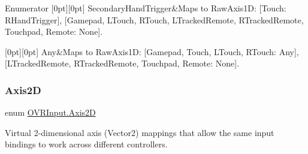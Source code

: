 \begin{DoxyEnumFields}{Enumerator}
[0pt][0pt]{}\mbox{\label{class_o_v_r_input_af5c3e63489ca9ee2e5db3a657f7f27f6aad324586099c56274933df3594e0da91}} 
Secondary\+Hand\+Trigger&Maps to Raw\+Axis1D\+: \mbox{[}Touch\+: R\+Hand\+Trigger\mbox{]}, \mbox{[}Gamepad, L\+Touch, R\+Touch, L\+Tracked\+Remote, R\+Tracked\+Remote, Touchpad, Remote\+: None\mbox{]}. \\
\hline

[0pt][0pt]{}\mbox{\label{class_o_v_r_input_af5c3e63489ca9ee2e5db3a657f7f27f6aed36a1ef76a59ee3f15180e0441188ad}} 
Any&Maps to Raw\+Axis1D\+: \mbox{[}Gamepad, Touch, L\+Touch, R\+Touch\+: Any\mbox{]}, \mbox{[}L\+Tracked\+Remote, R\+Tracked\+Remote, Touchpad, Remote\+: None\mbox{]}. \\
\hline

\end{DoxyEnumFields}
\mbox{\label{class_o_v_r_input_a8d8de8321e36e4c5c3b5266b72468d8a}} 
\subsubsection{\texorpdfstring{Axis2D}{Axis2D}}
{\footnotesize\ttfamily enum \mbox{\hyperlink{class_o_v_r_input_a8d8de8321e36e4c5c3b5266b72468d8a}{O\+V\+R\+Input.\+Axis2D}}\hspace{0.3cm}{\ttfamily [strong]}}



Virtual 2-\/dimensional axis (Vector2) mappings that allow the same input bindings to work across different controllers. 

